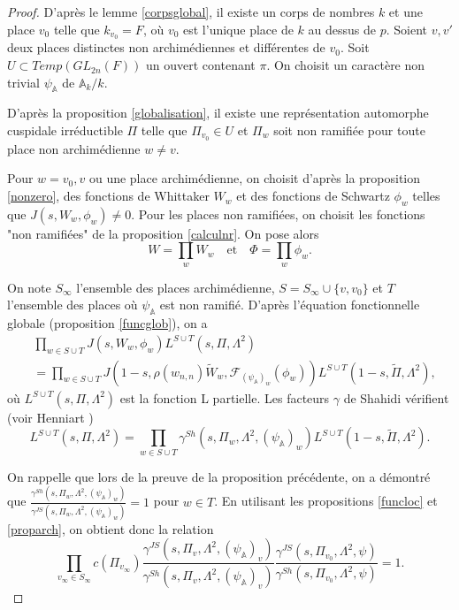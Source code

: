 \documentclass{amsart}
\begin{document}
 \begin{proof}
 D'après le lemme \ref{corpsglobal}, il existe un corps de nombres $k$ et une place $v_0$ telle que $k_{v_0} = F$, où $v_0$ est l'unique place de $k$ au dessus de $p$. Soient $v,v'$ deux places distinctes non archimédiennes et différentes de $v_0$. Soit $U \subset Temp(GL_{2n}(F))$ un ouvert contenant $\pi$. On choisit un caractère non trivial $\psi_\mathbb{A}$ de $\mathbb{A}_k/k$.
 
 D'après la proposition \ref{globalisation}, il existe une représentation automorphe cuspidale irréductible $\Pi$ telle que $\Pi_{v_0} \in U$ et $\Pi_w$ soit non ramifiée pour toute place non archimédienne $w \neq v$.
 
 Pour $w = v_0,v$ ou une place archimédienne, on choisit d'après la proposition \ref{nonzero}, des fonctions de Whittaker $W_w$ et des fonctions de Schwartz $\phi_w$ telles que $J(s, W_w, \phi_w) \neq 0$. Pour les places non ramifiées, on choisit les fonctions "non ramifiées" de la proposition \ref{calculnr}. On pose alors
 $$W = \prod_w W_w \quad \text{et} \quad \Phi  = \prod_w \phi_w.$$
 
 On note $S_\infty$ l'ensemble des places archimédienne, $S = S_\infty \cup \{v,v_0\}$ et $T$ l'ensemble des places où $\psi_\mathbb{A}$ est non ramifié. D'après l'équation fonctionnelle globale (proposition \ref{funcglob}), on a
 \begin{equation}
 \begin{split}
 &\prod_{w \in S \cup T} J(s, W_w, \phi_w) L^{S \cup T}(s, \Pi, \Lambda^2)\\
 &= \prod_{w \in S \cup T} J(1-s, \rho(w_{n,n})\tilde{W}_w, \mathcal{F}_{(\psi_\mathbb{A})_w}(\phi_w)) L^{S \cup T}(1-s, \tilde{\Pi}, \Lambda^2),
 \end{split}
 \end{equation}
  où $L^{S \cup T}(s, \Pi, \Lambda^2)$ est la fonction L partielle. Les facteurs $\gamma$ de Shahidi vérifient (voir Henniart \cite{henniart})
 \begin{equation}
 L^{S \cup T}(s, \Pi, \Lambda^2) = \prod_{w \in S \cup T}\gamma^{Sh}(s, \Pi_w, \Lambda^2, (\psi_\mathbb{A})_w) L^{S \cup T}(1-s, \tilde{\Pi}, \Lambda^2).
 \end{equation}
 
 On rappelle que lors de la preuve de la proposition précédente, on a démontré que $\frac{\gamma^{Sh}(s, \Pi_w, \Lambda^2, (\psi_\mathbb{A})_w)}{\gamma^{JS}(s, \Pi_w, \Lambda^2, (\psi_\mathbb{A})_w)} = 1$ pour $w \in T$. En utilisant les propositions \ref{funcloc} et \ref{proparch}, on obtient donc la relation
 \begin{equation}
 \prod_{v_\infty \in S_\infty} c(\Pi_{v_\infty}) \frac{\gamma^{JS}(s, \Pi_v, \Lambda^2, (\psi_\mathbb{A})_v)}{\gamma^{Sh}(s, \Pi_v, \Lambda^2, (\psi_\mathbb{A})_v)}\frac{\gamma^{JS}(s, \Pi_{v_0}, \Lambda^2, \psi)}{\gamma^{Sh}(s, \Pi_{v_0}, \Lambda^2, \psi)} = 1.
 \end{equation}
 

\end{proof}
\end{document}
